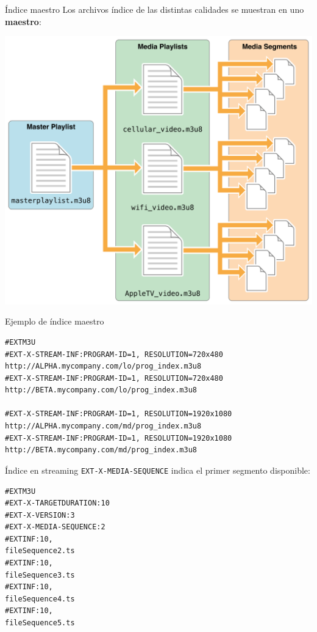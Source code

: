 \documentclass[10pt,compress,usetitleprogressbar,mathserif]{beamer}
\begin{document}
\begin{frame}[fragile]{Índice maestro}
  Los archivos índice de las distintas calidades se muestran en uno \textbf{maestro}:
\begin{center}
\includegraphics[scale=0.17]{img/indiceMaestro.png}
\end{center}
\end{frame}

\begin{frame}[fragile]{Ejemplo de índice maestro}
\begin{lstlisting}
#EXTM3U
#EXT-X-STREAM-INF:PROGRAM-ID=1, RESOLUTION=720x480
http://ALPHA.mycompany.com/lo/prog_index.m3u8
#EXT-X-STREAM-INF:PROGRAM-ID=1, RESOLUTION=720x480
http://BETA.mycompany.com/lo/prog_index.m3u8

#EXT-X-STREAM-INF:PROGRAM-ID=1, RESOLUTION=1920x1080
http://ALPHA.mycompany.com/md/prog_index.m3u8
#EXT-X-STREAM-INF:PROGRAM-ID=1, RESOLUTION=1920x1080
http://BETA.mycompany.com/md/prog_index.m3u8
\end{lstlisting}
\end{frame}

\begin{frame}[fragile]{Índice en streaming}
\texttt{EXT-X-MEDIA-SEQUENCE} indica el primer segmento disponible:

\begin{lstlisting}
#EXTM3U
#EXT-X-TARGETDURATION:10
#EXT-X-VERSION:3
#EXT-X-MEDIA-SEQUENCE:2
#EXTINF:10,
fileSequence2.ts
#EXTINF:10,
fileSequence3.ts
#EXTINF:10,
fileSequence4.ts
#EXTINF:10,
fileSequence5.ts
\end{lstlisting}
\end{frame}
\end{document}
